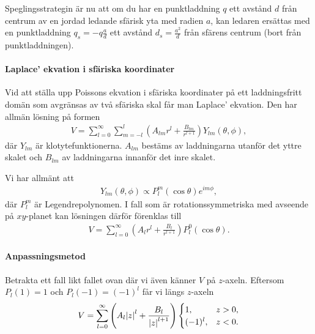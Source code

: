 Speglingsstrategin är nu att om du har en punktladdning $q$ ett avstånd $d$ från centrum av en jordad ledande sfärisk yta med radien $a$, kan ledaren ersättas med en punktladdning $q_{s} = -q\frac{a}{d}$ ett avstånd $d_{s} = \frac{a^{2}}{d}$ från sfärens centrum (bort från punktladdningen).

\paragraph{Laplace' ekvation i sfäriska koordinater}
Vid att ställa upp Poissons ekvation i sfäriska koordinater på ett laddningsfritt domän som avgränsas av två sfäriska skal får man Laplace' ekvation. Den har allmän lösning på formen
\begin{align*}
	V = \sum\limits_{l = 0}^{\infty}\sum\limits_{m = -l}^{l}\left(A_{lm}r^{l} + \frac{B_{lm}}{r^{l + 1}}\right)Y_{lm}(\theta, \phi),
\end{align*}
där $Y_{lm}$ är klotytefunktionerna. $A_{lm}$ bestäms av laddningarna utanför det yttre skalet och $B_{lm}$ av laddningarna innanför det inre skalet.

Vi har allmänt att
\begin{align*}
	Y_{lm}(\theta, \phi)\propto P_{l}^{m}(\cos{\theta})e^{im\phi},
\end{align*}
där $P_{l}^{m}$ är Legendrepolynomen. I fall som är rotationssymmetriska med avseende på $xy$-planet kan lösningen därför förenklas till
\begin{align*}
	V = \sum\limits_{l = 0}^{\infty}\left(A_{l}r^{l} + \frac{B_{l}}{r^{l + 1}}\right)P_{l}^{0}(\cos{\theta}).
\end{align*}

\paragraph{Anpassningsmetod}
Betrakta ett fall likt fallet ovan där vi även känner $V$ på $z$-axeln. Eftersom $P_{l}(1) = 1$ och $P_{l}(-1) = (-1)^{l}$ får vi längs $z$-axeln
\begin{align*}
	V = \sum\limits_{l = 0}^{\infty}\left(A_{l}\abs{z}^{l} + \frac{B_{l}}{\abs{z}^{l + 1}}\right)
	\begin{cases}
		1,        &z > 0, \\
		(-1)^{l}, &z < 0.
	\end{cases}
\end{align*}